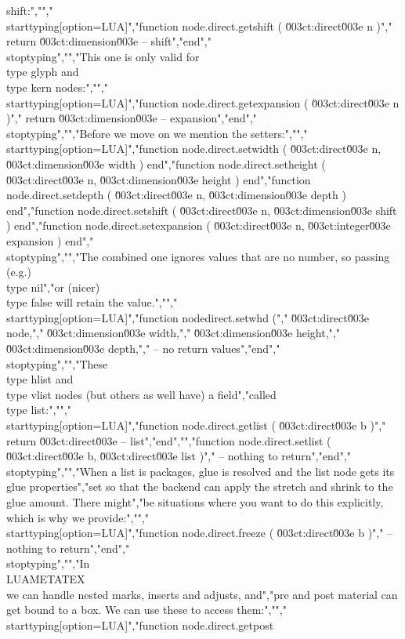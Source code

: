 shift:","","\\starttyping[option=LUA]","function node.direct.getshift ( \u003ct:direct\u003e n )","    return \u003ct:dimension\u003e -- shift","end","\\stoptyping","","This one is only valid for \\type {glyph} and \\type {kern} nodes:","","\\starttyping[option=LUA]","function node.direct.getexpansion ( \u003ct:direct\u003e n )","    return \u003ct:dimension\u003e -- expansion","end","\\stoptyping","","Before we move on we mention the setters:","","\\starttyping[option=LUA]","function node.direct.setwidth     ( \u003ct:direct\u003e n, \u003ct:dimension\u003e width     ) end","function node.direct.setheight    ( \u003ct:direct\u003e n, \u003ct:dimension\u003e height    ) end","function node.direct.setdepth     ( \u003ct:direct\u003e n, \u003ct:dimension\u003e depth     ) end","function node.direct.setshift     ( \u003ct:direct\u003e n, \u003ct:dimension\u003e shift     ) end","function node.direct.setexpansion ( \u003ct:direct\u003e n, \u003ct:integer\u003e   expansion ) end","\\stoptyping","","The combined one ignores values that are no number, so passing (e.g.) \\type {nil}","or (nicer) \\type {false} will retain the value.","","\\starttyping[option=LUA]","function nodedirect.setwhd (","    \u003ct:direct\u003e    node,","    \u003ct:dimension\u003e width,","    \u003ct:dimension\u003e height,","    \u003ct:dimension\u003e depth,","    -- no return values","end","\\stoptyping","","These \\type {hlist} and \\type {vlist} nodes (but others as well have) a field","called \\type {list}:","","\\starttyping[option=LUA]","function node.direct.getlist ( \u003ct:direct\u003e b )","    return \u003ct:direct\u003e -- list","end","","function node.direct.setlist ( \u003ct:direct\u003e b, \u003ct:direct\u003e list )","    -- nothing to return","end","\\stoptyping","","When a list is packages, glue is resolved and the list node gets its glue properties","set so that the backend can apply the stretch and shrink to the glue amount. There might","be situations where you want to do this explicitly, which is why we provide:","","\\starttyping[option=LUA]","function node.direct.freeze ( \u003ct:direct\u003e b )","    -- nothing to return","end","\\stoptyping","","In \\LUAMETATEX\\ we can handle nested marks, inserts and adjusts, and","pre and post material can get bound to a box. We can use these to access them:","","\\starttyping[option=LUA]","function node.direct.getpost 